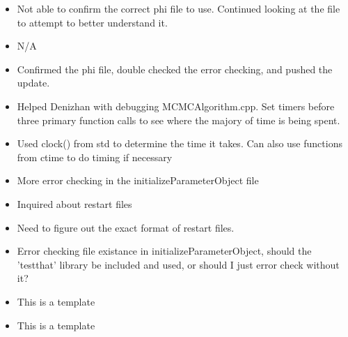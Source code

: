 \documentclass[12pt,hyperref]{labbook}
\begin{document}
\begin{itemize}
  \item Not able to confirm the correct phi file to use. Continued looking at
the  file to attempt to better understand it.  
\end{itemize}
\begin{itemize}
  \item N/A
\end{itemize}

\begin{itemize}
  \item Confirmed the phi file, double checked the error checking, and pushed
the update. 
  \item Helped Denizhan with debugging MCMCAlgorithm.cpp. Set timers before
three primary function calls to see where the majory of time is being spent.  
\end{itemize}
\begin{itemize}
  \item Used clock() from std to determine the time it takes. Can also use
functions from ctime to do timing if necessary
\end{itemize}

\begin{itemize}
  \item More error checking in the initializeParameterObject file
  \item Inquired about restart files 
\end{itemize}
\begin{itemize}
  \item Need to figure out the exact format of restart files. 
  \item Error checking file existance in initializeParameterObject, should the
'testthat' library be included and used, or should I just error check without
it?
\end{itemize}





\begin{itemize}
  \item This is a template
\end{itemize}
\begin{itemize}
  \item This is a template
\end{itemize}


 
\end{document}
